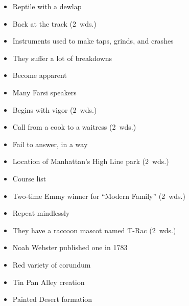 {\begin{itemize}
      \item
        Reptile with a dewlap
      \item
        Back at the track (2~wds.)
    \end{itemize}
  \item
    \begin{itemize}
      \item
        Instruments used to make taps, grinds, and crashes
      \item
        They suffer a lot of breakdowns
    \end{itemize}
  \item
    \begin{itemize}
      \item
        Become apparent
      \item
        Many Farsi speakers
    \end{itemize}
  \item
    \begin{itemize}
      \item
        Begins with vigor (2~wds.)
      \item
        Call from a cook to a waitress (2~wds.)
    \end{itemize}
  \item
    \begin{itemize}
      \item
        Fail to answer, in a way
      \item
        Location of Manhattan's High Line park (2~wds.)
    \end{itemize}
  \item
    \begin{itemize}
      \item
        Course list
      \item
        Two-time Emmy winner for ``Modern Family'' (2~wds.)
    \end{itemize}
}{%
  \item
    \begin{itemize}
      \item
        Repeat mindlessly
      \item
        They have a raccoon mascot named T-Rac (2~wds.)
      \item
        Noah Webster published one in 1783
      \item
        Red variety of corundum
      \item
        Tin Pan Alley creation
      \item
        Painted Desert formation

\end{itemize}}
